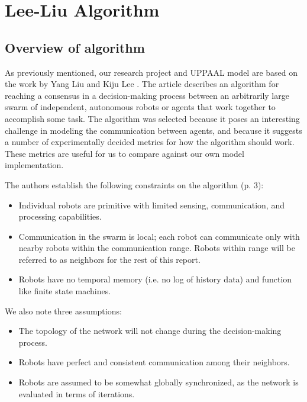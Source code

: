 \section{Lee-Liu Algorithm}
\subsection{Overview of algorithm}
As previously mentioned, our research project and UPPAAL model are based on the work by Yang Liu and Kiju Lee \parencite{AlgorithmPaper}. The article describes an algorithm for reaching a consensus in a decision-making process between an arbitrarily large swarm of independent, autonomous robots or agents that work together to accomplish some task. The algorithm was selected because it poses an interesting challenge in modeling the communication between agents, and because it suggests a number of experimentally decided metrics for how the algorithm should work. These metrics are useful for us to compare against our own model implementation.

The authors establish the following constraints on the algorithm (p. 3):
\begin{itemize}
\item Individual robots are primitive with limited sensing, communication, and processing capabilities.
\item Communication in the swarm is local; each robot can communicate only with nearby robots within the communication range. Robots within range will be referred to as neighbors for the rest of this report.
\item Robots have no temporal memory (i.e. no log of history data) and function like finite state machines.
\end{itemize}
We also note three assumptions:
\begin{itemize}
    \item The topology of the network will not change during the decision-making process.
    \item Robots have perfect and consistent communication among their neighbors.
    \item Robots are assumed to be somewhat globally synchronized, as the network is evaluated in terms of iterations. 
\end{itemize}

